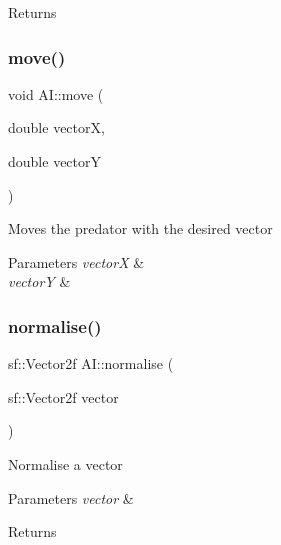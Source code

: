 \begin{DoxyReturn}{Returns}

\end{DoxyReturn}
\mbox{\label{class_a_i_a9761e86bf135a4ccf1b24326a5a01431}} 
\subsubsection{\texorpdfstring{move()}{move()}}
{\footnotesize\ttfamily void A\+I\+::move (\begin{DoxyParamCaption}\item[{double}]{vectorX,  }\item[{double}]{vectorY }\end{DoxyParamCaption})}



Moves the predator with the desired vector 


\begin{DoxyParams}{Parameters}
{\em vectorX} & \\
\hline
{\em vectorY} & \\
\hline
\end{DoxyParams}
\mbox{\label{class_a_i_a80cd7b646be694678ef28cdf9d9af17e}} 
\subsubsection{\texorpdfstring{normalise()}{normalise()}}
{\footnotesize\ttfamily sf\+::\+Vector2f A\+I\+::normalise (\begin{DoxyParamCaption}\item[{sf\+::\+Vector2f}]{vector }\end{DoxyParamCaption})}



Normalise a vector 


\begin{DoxyParams}{Parameters}
{\em vector} & \\
\hline
\end{DoxyParams}
\begin{DoxyReturn}{Returns}

\end{DoxyReturn}
\mbox{\label{class_a_i_a9394f659105b698a75e1fe77f6014e0b}} 
